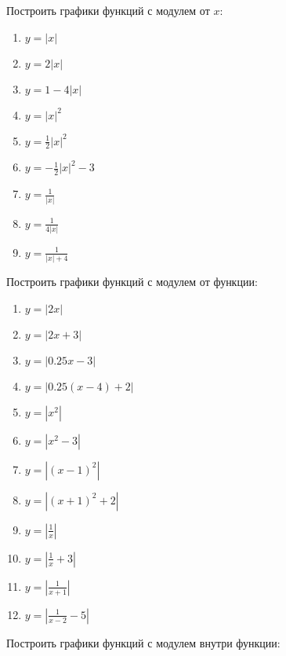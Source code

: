 \documentclass[algebra,twocolumn]{pum}
\begin{document}
\begin{exercises}
  \begin{question}
    Построить графики функций с модулем от $x$:
    \begin{multicols}{2}
      \begin{enumerate}[label=\arabic*)]
        \item $y=|x|$
        \item $y=2|x|$
        \item $y=1-4|x|$
        \item $y=|x|^2$
        \item $y=\frac{1}{2}|x|^2$
        \item $y=-\frac{1}{2}|x|^2-3$
        \item $y=\frac{1}{|x|}$
        \item $y=\frac{1}{4|x|}$
        \item $y=\frac{1}{|x|+4}$
      \end{enumerate}
    \end{multicols}
  \end{question}
  \begin{question}
    Построить графики функций с модулем от функции:
    \begin{multicols}{2}
      \begin{enumerate}[label=\arabic*)]
        \item $y=|2x|$
        \item $y=|2x+3|$
        \item $y=|0.25x-3|$
        \item $y=|0.25(x-4)+2|$
        \item $y=|x^2|$
        \item $y=|x^2-3|$
        \item $y=|(x-1)^2|$
        \item $y=|(x+1)^2+2|$
        \item $y=\left|\frac{1}{x}\right|$
        \item $y=\left|\frac{1}{x}+3\right|$
        \item $y=\left|\frac{1}{x+1}\right|$
        \item $y=\left|\frac{1}{x-2}-5\right|$
      \end{enumerate}
    \end{multicols}
  \end{question}
  \begin{question}
    Построить графики функций с модулем внутри функции:
    \begin{multicols}{2}

\end{multicols}
\end{question}
\end{exercises}
\end{document}
